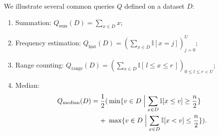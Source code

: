


We illustrate several common queries $Q$ defined on a dataset $D$:

\begin{enumerate}
    \item Summation: $Q_{\text{sum}}(D) = \sum_{x \in D} x$;
    \item Frequency estimation: $Q_{\text{hist}}(D) = ( \sum_{x \in D} \mathbb{I}[x = j] )_{j=0}^{U}$; %
    \item Range counting: $Q_{\text{range}}(D) = ( \sum_{x \in D}\mathbb{I}[\,l \le x \le r\,] )_{0 \leq l \leq r < U}$; 
    \item Median: 
    \[
    \begin{aligned}
        Q_{\mathrm{median}}(D) = \frac{1}{2} (
        & \min\{ v\in D \Bigm| \sum_{x \in D}\mathbb{I}[x\le v]\ge\frac{n}{2} \} \\
        + \  &\max\{ v\in D \Bigm| \sum_{x \in D}\mathbb{I}[x< v]\le\frac{n}{2}\}).
    \end{aligned}
    \]
\end{enumerate}

